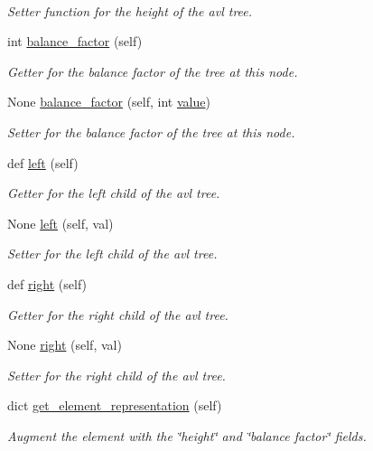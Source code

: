 \begin{DoxyCompactItemize}
$$\begin{DoxyCompactList}\small\item\em Setter function for the height of the avl tree. \end{DoxyCompactList}\item 
int \mbox{\hyperlink{classbridges_1_1avl__tree__element_1_1_a_v_l_tree_element_a55d0ce96bb49325807232aa084876505}{balance\+\_\+factor}} (self)
\begin{DoxyCompactList}\small\item\em Getter for the balance factor of the tree at this node. \end{DoxyCompactList}\item 
None \mbox{\hyperlink{classbridges_1_1avl__tree__element_1_1_a_v_l_tree_element_aaf931b718c678cfc919e2267d1efa412}{balance\+\_\+factor}} (self, int \mbox{\hyperlink{classbridges_1_1element_1_1_element_ad18e8738e025d7af322144aecbec1629}{value}})
\begin{DoxyCompactList}\small\item\em Setter for the balance factor of the tree at this node. \end{DoxyCompactList}\item 
def \mbox{\hyperlink{classbridges_1_1avl__tree__element_1_1_a_v_l_tree_element_a717696b26736f5c9585fefc7c5ab88f1}{left}} (self)
\begin{DoxyCompactList}\small\item\em Getter for the left child of the avl tree. \end{DoxyCompactList}\item 
None \mbox{\hyperlink{classbridges_1_1avl__tree__element_1_1_a_v_l_tree_element_a5ee29c8a42e07019a77ecd7a2534f8be}{left}} (self, val)
\begin{DoxyCompactList}\small\item\em Setter for the left child of the avl tree. \end{DoxyCompactList}\item 
def \mbox{\hyperlink{classbridges_1_1avl__tree__element_1_1_a_v_l_tree_element_aaab3b79617e7e503b1a7c28069d1eb15}{right}} (self)
\begin{DoxyCompactList}\small\item\em Getter for the right child of the avl tree. \end{DoxyCompactList}\item 
None \mbox{\hyperlink{classbridges_1_1avl__tree__element_1_1_a_v_l_tree_element_a5aa36d46b0c6ac791893823500c77a08}{right}} (self, val)
\begin{DoxyCompactList}\small\item\em Setter for the right child of the avl tree. \end{DoxyCompactList}\item 
dict \mbox{\hyperlink{classbridges_1_1avl__tree__element_1_1_a_v_l_tree_element_abf8842cb462f1e31f0889d67fb0d70d4}{get\+\_\+element\+\_\+representation}} (self)
\begin{DoxyCompactList}\small\item\em Augment the element with the \char`\"{}height\char`\"{} and \char`\"{}balance factor\char`\"{} fields. \end{DoxyCompactList}\end{DoxyCompactItemize}
